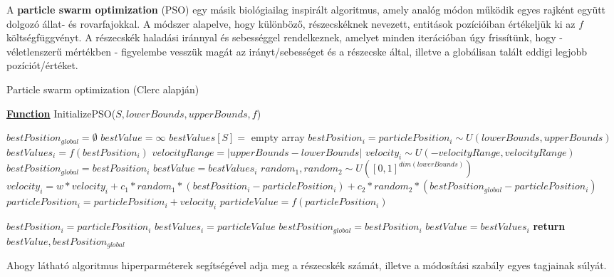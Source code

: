 A \textbf{particle swarm optimization} (PSO) egy másik biológiailag inspirált algoritmus, amely analóg módon működik egyes rajként együtt dolgozó állat- és rovarfajokkal\cite{non_gradient_optimization, pso, modified_pso}. A módszer alapelve, hogy különböző, részecskéknek nevezett, entitások pozícióiban értékeljük ki az $f$ költségfüggvényt. A részecskék haladási iránnyal és sebességgel rendelkeznek, amelyet minden iterációban úgy frissítünk, hogy - véletlenszerű mértékben - figyelembe vesszük magát az irányt/sebességet és a részecske által, illetve a globálisan talált eddigi legjobb pozíciót/értéket.


\begin{algorithm}[H]
\caption{Particle swarm optimization (Clerc alapján\cite{pso_alg})}
\label{alg:pso} 
\textbf{\underline{Function}} InitializePSO($S, lowerBounds, upperBounds, f$)
\begin{algorithmic}[1] %
\STATE $bestPosition_{global} = \emptyset$
\STATE $bestValue = \infty$
\STATE $bestValues[S] =$ empty array
	\STATE $bestPosition_i = particlePosition_i \sim U(lowerBounds, upperBounds)$
	\STATE $bestValues_i = f(bestPosition_i)$
	\STATE $velocityRange = |upperBounds-lowerBounds|$
	\STATE $velocity_i \sim U(-velocityRange, velocityRange)$
		\STATE $bestPosition_{global} = bestPosition_i$
		\STATE $bestValue = bestValues_i$
	\ENDIF
\ENDFOR
{}
		\STATE $random_1, random_2 \sim U([0,1]^{dim(lowerBounds)})$
		\STATE $velocity_i = w*velocity_i + c_1*random_1*(bestPosition_i-particlePosition_i) + c_2*random_2*(bestPosition_{global}-particlePosition_i)$
		\STATE $particlePosition_i = particlePosition_i + velocity_i$ 
		\STATE $particleValue = f(particlePosition_i)$
		
			\STATE $bestPosition_i = particlePosition_i$
			\STATE $bestValues_i = particleValue$
				\STATE $bestPosition_{global} = bestPosition_i$
				\STATE $bestValue = bestValues_i$
			\ENDIF
		\ENDIF
	\ENDFOR
\ENDWHILE
\STATE \textbf{return} $bestValue, bestPosition_{global}$
\end{algorithmic}
\end{algorithm}


Ahogy látható algoritmus hiperparméterek segítségével adja meg a részecskék számát, illetve a módosítási szabály egyes tagjainak súlyát. %


